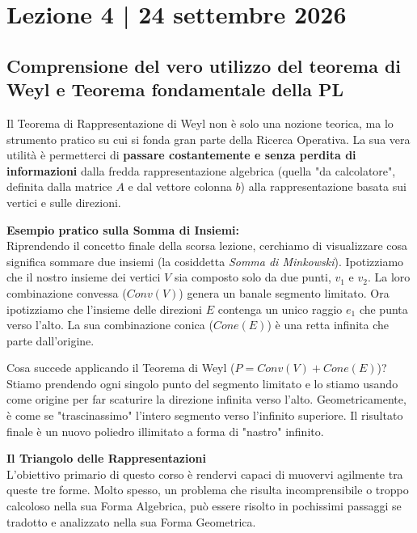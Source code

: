 \documentclass[12pt, a4paper]{article}
\begin{document}
	\section*{Lezione 4 | 24 settembre 2026}
	\subsection*{Comprensione del vero utilizzo del teorema di Weyl e Teorema fondamentale della PL}
	
	Il Teorema di Rappresentazione di Weyl non è solo una nozione teorica, ma lo strumento pratico su cui si fonda gran parte della Ricerca Operativa. La sua vera utilità è permetterci di \textbf{passare costantemente e senza perdita di informazioni} dalla fredda rappresentazione algebrica (quella "da calcolatore", definita dalla matrice $A$ e dal vettore colonna $b$) alla rappresentazione basata sui vertici e sulle direzioni.
	
	\vspace{0.2cm}
	\textbf{Esempio pratico sulla Somma di Insiemi:}\\
	Riprendendo il concetto finale della scorsa lezione, cerchiamo di visualizzare cosa significa sommare due insiemi (la cosiddetta \textit{Somma di Minkowski}). 
	Ipotizziamo che il nostro insieme dei vertici $V$ sia composto solo da due punti, $v_1$ e $v_2$. La loro combinazione convessa ($Conv(V)$) genera un banale segmento limitato. 
	Ora ipotizziamo che l'insieme delle direzioni $E$ contenga un unico raggio $e_1$ che punta verso l'alto. La sua combinazione conica ($Cone(E)$) è una retta infinita che parte dall'origine. 
	
	Cosa succede applicando il Teorema di Weyl ($P = Conv(V) + Cone(E)$)? 
	Stiamo prendendo ogni singolo punto del segmento limitato e lo stiamo usando come origine per far scaturire la direzione infinita verso l'alto. Geometricamente, è come se "trascinassimo" l'intero segmento verso l'infinito superiore. Il risultato finale è un nuovo poliedro illimitato a forma di "nastro" infinito.
	
	\vspace{0.4cm}
	\textbf{Il Triangolo delle Rappresentazioni}\\
	L'obiettivo primario di questo corso è rendervi capaci di muovervi agilmente tra queste tre forme. Molto spesso, un problema che risulta incomprensibile o troppo calcoloso nella sua Forma Algebrica, può essere risolto in pochissimi passaggi se tradotto e analizzato nella sua Forma Geometrica.
	
\end{document}
